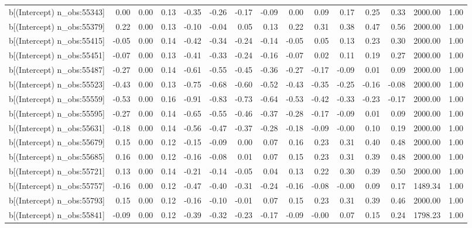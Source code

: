 \begin{table}[ht]
\begin{tabular}{rrrrrrrrrrrrrrr}
  b[(Intercept) n\_obs:55343] & 0.00 & 0.00 & 0.13 & -0.35 & -0.26 & -0.17 & -0.09 & 0.00 & 0.09 & 0.17 & 0.25 & 0.33 & 2000.00 & 1.00 \\ 
  b[(Intercept) n\_obs:55379] & 0.22 & 0.00 & 0.13 & -0.10 & -0.04 & 0.05 & 0.13 & 0.22 & 0.31 & 0.38 & 0.47 & 0.56 & 2000.00 & 1.00 \\ 
  b[(Intercept) n\_obs:55415] & -0.05 & 0.00 & 0.14 & -0.42 & -0.34 & -0.24 & -0.14 & -0.05 & 0.05 & 0.13 & 0.23 & 0.30 & 2000.00 & 1.00 \\ 
  b[(Intercept) n\_obs:55451] & -0.07 & 0.00 & 0.13 & -0.41 & -0.33 & -0.24 & -0.16 & -0.07 & 0.02 & 0.11 & 0.19 & 0.27 & 2000.00 & 1.00 \\ 
  b[(Intercept) n\_obs:55487] & -0.27 & 0.00 & 0.14 & -0.61 & -0.55 & -0.45 & -0.36 & -0.27 & -0.17 & -0.09 & 0.01 & 0.09 & 2000.00 & 1.00 \\ 
  b[(Intercept) n\_obs:55523] & -0.43 & 0.00 & 0.13 & -0.75 & -0.68 & -0.60 & -0.52 & -0.43 & -0.35 & -0.25 & -0.16 & -0.08 & 2000.00 & 1.00 \\ 
  b[(Intercept) n\_obs:55559] & -0.53 & 0.00 & 0.16 & -0.91 & -0.83 & -0.73 & -0.64 & -0.53 & -0.42 & -0.33 & -0.23 & -0.17 & 2000.00 & 1.00 \\ 
  b[(Intercept) n\_obs:55595] & -0.27 & 0.00 & 0.14 & -0.65 & -0.55 & -0.46 & -0.37 & -0.28 & -0.17 & -0.09 & 0.01 & 0.09 & 2000.00 & 1.00 \\ 
  b[(Intercept) n\_obs:55631] & -0.18 & 0.00 & 0.14 & -0.56 & -0.47 & -0.37 & -0.28 & -0.18 & -0.09 & -0.00 & 0.10 & 0.19 & 2000.00 & 1.00 \\ 
  b[(Intercept) n\_obs:55679] & 0.15 & 0.00 & 0.12 & -0.15 & -0.09 & 0.00 & 0.07 & 0.16 & 0.23 & 0.31 & 0.40 & 0.48 & 2000.00 & 1.00 \\ 
  b[(Intercept) n\_obs:55685] & 0.16 & 0.00 & 0.12 & -0.16 & -0.08 & 0.01 & 0.07 & 0.15 & 0.23 & 0.31 & 0.39 & 0.48 & 2000.00 & 1.00 \\ 
  b[(Intercept) n\_obs:55721] & 0.13 & 0.00 & 0.14 & -0.21 & -0.14 & -0.05 & 0.04 & 0.13 & 0.22 & 0.30 & 0.39 & 0.50 & 2000.00 & 1.00 \\ 
  b[(Intercept) n\_obs:55757] & -0.16 & 0.00 & 0.12 & -0.47 & -0.40 & -0.31 & -0.24 & -0.16 & -0.08 & -0.00 & 0.09 & 0.17 & 1489.34 & 1.00 \\ 
  b[(Intercept) n\_obs:55793] & 0.15 & 0.00 & 0.12 & -0.16 & -0.10 & -0.01 & 0.07 & 0.15 & 0.23 & 0.31 & 0.39 & 0.46 & 2000.00 & 1.00 \\ 
  b[(Intercept) n\_obs:55841] & -0.09 & 0.00 & 0.12 & -0.39 & -0.32 & -0.23 & -0.17 & -0.09 & -0.00 & 0.07 & 0.15 & 0.24 & 1798.23 & 1.00 \\ 

\end{tabular}
\end{table}
